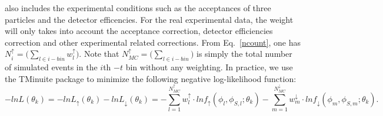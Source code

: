 also includes the experimental conditions such as the acceptances of three
particles and the detector efficencies. For the real experimental data, the
weight will only takes into account the acceptance correction, detector
efficiencies correction and other experimental related corrections. From
Eq.~\ref{ncount}, one has $ N^{\uparrow}_{i} = \bigl(\sum_{l\in
  i-bin}w^{\uparrow}_{l})$. Note that $N_{MC}^{\uparrow}= \bigl(\sum_{l\in
  i-bin})$ is simply the total number of simulated events in the $i$th $-t$ bin
without any weighting. In practice, we use the TMinuite package to minimize the
following negative log-likelihood function:
\begin{equation}
  -lnL(\theta_{k}) =-ln
  L_{\uparrow}(\theta_{k})-lnL_{\downarrow}(\theta_{k})=-\sum_{l=1}^{N_{MC}^{\uparrow}}
  w^{\uparrow}_{l}\cdot lnf_{\uparrow}(\phi_{l},
  \phi_{S,l};\theta_{k})-\sum_{m=1}^{N_{MC}^{\downarrow}}
  w^{\downarrow}_{m}\cdot lnf_{\downarrow}(\phi_{m}, \phi_{S,m};\theta_{k}).
\end{equation}


